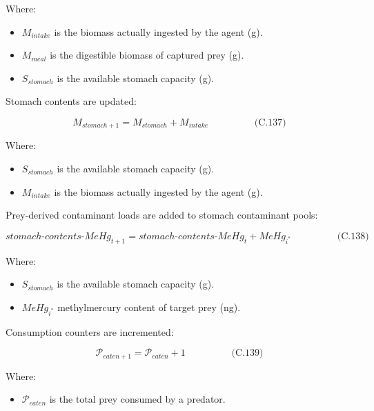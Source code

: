 \documentclass[
]{book}
\providecommand{\tightlist}{%
  \setlength{\itemsep}{0pt}\setlength{\parskip}{0pt}}
\begin{document}
Where:

\begin{itemize}
\tightlist
\item
  \(M_{intake}\) is the biomass actually ingested by the agent (g).
\item
  \(M_{meal}\) is the digestible biomass of captured prey (g).
\item
  \(S_{stomach}\) is the available stomach capacity (g).
\end{itemize}

Stomach contents are updated:

\[
\begin{equation} M_{stomach+1} = M_{stomach} + M_{intake}  \hspace{2cm} \text{(C.137)} \end{equation}
\]

Where:

\begin{itemize}
\tightlist
\item
  \(S_{stomach}\) is the available stomach capacity (g).
\item
  \(M_{intake}\) is the biomass actually ingested by the agent (g).
\end{itemize}

Prey-derived contaminant loads are added to stomach contaminant pools:

\[
\begin{equation} stomach\text{-}contents\text{-}MeHg_{t+1} = stomach\text{-}contents\text{-}MeHg_t + MeHg_{i^*}  \hspace{2cm} \text{(C.138)} \end{equation}
\]

Where:

\begin{itemize}
\tightlist
\item
  \(S_{stomach}\) is the available stomach capacity (g).
\item
  \(MeHg_{i^*}\) methylmercury content of target prey (ng).
\end{itemize}

Consumption counters are incremented:

\[
\begin{equation} \mathcal{P}_{eaten+1} = \mathcal{P}_{eaten} + 1  \hspace{2cm} \text{(C.139)} \end{equation}
\]

Where:

\begin{itemize}
\tightlist
\item
  \(\mathcal{P}_{eaten}\) is the total prey consumed by a predator.
\end{itemize}
\end{document}
